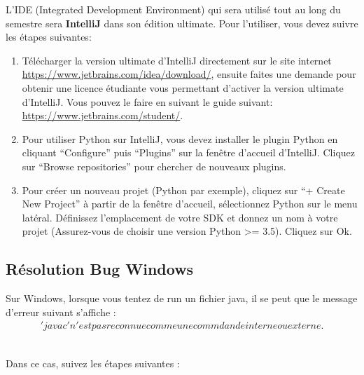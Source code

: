 L'IDE (Integrated Development Environment) qui sera utilisé tout au long du semestre sera \textbf{IntelliJ} dans son édition ultimate. Pour l'utiliser, vous devez suivre les étapes suivantes:
\begin{enumerate}
    \item Télécharger la version ultimate d'IntelliJ directement sur le site internet \url{https://www.jetbrains.com/idea/download/}, ensuite faites une demande pour obtenir une licence étudiante vous permettant d'activer la version ultimate d'IntelliJ. Vous pouvez le faire en suivant le guide suivant: \url{https://www.jetbrains.com/student/}.
    \item Pour utiliser Python sur IntelliJ, vous devez installer le plugin Python en cliquant ``Configure'' puis ``Plugins'' sur la fenêtre d'accueil d'IntelliJ. Cliquez sur ``Browse repositories'' pour chercher de nouveaux plugins.
    \item Pour créer un nouveau projet (Python par exemple), cliquez sur ``+ Create New Project'' à partir de la fenêtre d'accueil, sélectionnez Python sur le menu latéral. Définissez l'emplacement de votre SDK et donnez un nom à votre projet (Assurez-vous de choisir une version Python >= 3.5). Cliquez sur Ok.
\end{enumerate}

\subsection*{Résolution Bug Windows}

Sur Windows, lorsque vous tentez de run un fichier java, il se peut que le message d'erreur suivant s'affiche :\\


\begin{align}
    'javac' n'est pas reconnue comme une commdande interne ou externe.
\end{align}

\\
Dans ce cas, suivez les étapes suivantes :


